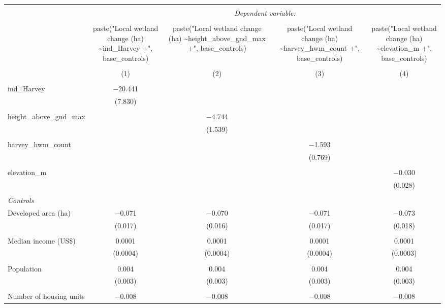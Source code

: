 \begin{tabular}{@{\extracolsep{5pt}}lcccc} 
\\[-1.8ex]\hline 
\hline \\[-1.8ex] 
 & \multicolumn{4}{c}{\textit{Dependent variable:}} \\ 
\cline{2-5} 
\\[-1.8ex] & paste("Local wetland change (ha) \textasciitilde ind\_Harvey +", base\_controls) & paste("Local wetland change (ha) \textasciitilde height\_above\_gnd\_max +", base\_controls) & paste("Local wetland change (ha) \textasciitilde harvey\_hwm\_count +", base\_controls) & paste("Local wetland change (ha) \textasciitilde elevation\_m +", base\_controls) \\ 
\\[-1.8ex] & (1) & (2) & (3) & (4)\\ 
\hline \\[-1.8ex] 
 ind\_Harvey & $-$20.441 &  &  &  \\ 
  & (7.830) &  &  &  \\ 
  & & & & \\ 
 height\_above\_gnd\_max &  & $-$4.744 &  &  \\ 
  &  & (1.539) &  &  \\ 
  & & & & \\ 
 harvey\_hwm\_count &  &  & $-$1.593 &  \\ 
  &  &  & (0.769) &  \\ 
  & & & & \\ 
 elevation\_m &  &  &  & $-$0.030 \\ 
  &  &  &  & (0.028) \\ 
  & & & & \\ 
 \emph{Controls} \\ Developed area (ha) & $-$0.071 & $-$0.070 & $-$0.071 & $-$0.073 \\ 
  & (0.017) & (0.016) & (0.017) & (0.018) \\ 
  & & & & \\ 
 Median income (US\$) & 0.0001 & 0.0001 & 0.0001 & 0.0001 \\ 
  & (0.0004) & (0.0004) & (0.0004) & (0.0003) \\ 
  & & & & \\ 
 Population & 0.004 & 0.004 & 0.004 & 0.004 \\ 
  & (0.003) & (0.003) & (0.003) & (0.003) \\ 
  & & & & \\ 
 Number of housing units & $-$0.008 & $-$0.008 & $-$0.008 & $-$0.008 \\ 

\end{tabular}
